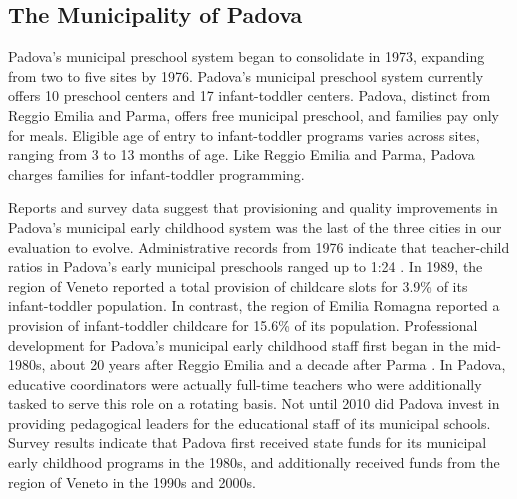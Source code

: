 \subsection{The Municipality of Padova}

Padova's municipal preschool system began to consolidate in 1973, expanding from two to five sites by 1976. Padova's municipal preschool system currently offers 10 preschool centers and 17 infant-toddler centers. Padova, distinct from Reggio Emilia and Parma, offers free municipal preschool, and families pay only for meals. Eligible age of entry to infant-toddler programs varies across sites, ranging from 3 to 13 months of age. Like Reggio Emilia and Parma, Padova charges families for infant-toddler programming. 

Reports and survey data suggest that provisioning and quality improvements in Padova's municipal early childhood system was the last of the three cities in our evaluation to evolve. Administrative records from 1976 indicate that teacher-child ratios in Padova's early municipal preschools ranged up to 1:24 \citep{Padova-Admin-Data_1964-2011,CEHD_2016_Historical-Analysis}. In 1989, the region of Veneto reported a total provision of childcare slots for 3.9\% of its infant-toddler population. In contrast, the region of Emilia Romagna reported a provision of infant-toddler childcare for 15.6\% of its population. Professional development for Padova's municipal early childhood staff first began in the mid-1980s, about 20 years after Reggio Emilia and a decade after Parma \citep{Becchi-Ferrari_1990_Pub-Inf-Centres-Italy,CEHD_2016_Historical-Analysis}. In Padova, educative coordinators were actually full-time teachers who were additionally tasked to serve this role on a rotating basis. Not until 2010 did Padova invest in providing pedagogical leaders for the educational staff of its municipal schools. Survey results indicate that Padova first received state funds for its municipal early childhood programs in the 1980s, and additionally received funds from the region of Veneto in the 1990s and 2000s. 


